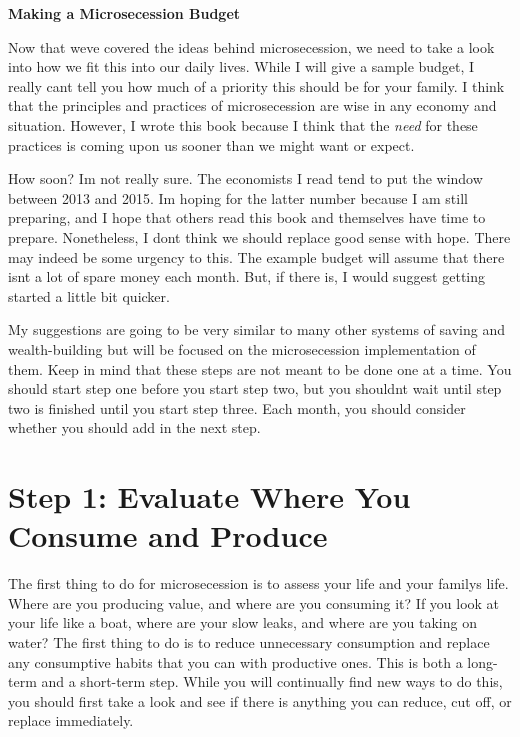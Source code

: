 \documentclass[letterpaper]{article}
\title{}
\begin{document}
\clearpage\setcounter{page}{1}\pagestyle{Standard}
{\centering{}\bfseries\color{black}
Making a Microsecession Budget
\par}

{\color{black}
Now that we{\textquotesingle}ve covered the ideas behind microsecession,
we need to take a look into how we fit this into our daily lives. While
I will give a sample budget, I really can{\textquotesingle}t tell you
how much of a priority this should be for your family. I think that the
principles and practices of microsecession are wise in any economy and
situation. However, I wrote this book because I think that the
\textit{need} for these practices is coming upon us sooner than we
might want or expect.}

{\color{black}
How soon?  I{\textquotesingle}m not really sure. The economists I read
tend to put the window between 2013 and 2015. I{\textquotesingle}m
hoping for the latter number because I am still preparing, and I hope
that others read this book and themselves have time to prepare.
Nonetheless, I don{\textquotesingle}t think we should replace good
sense with hope. There may indeed be some urgency to this. The example
budget will assume that there isn{\textquotesingle}t a lot of spare
money each month. But, if there is, I would suggest getting started a
little bit quicker.}

{\color{black}
My suggestions are going to be very similar to many other systems of
saving and wealth-building but will be focused on the microsecession
implementation of them.
\textcolor[rgb]{0.32941177,0.5529412,0.83137256}{Keep in mind that}
these steps are not meant to be done one at a time. You should start
step one before you start step two, but you shouldn{\textquotesingle}t
wait until step two is finished until you start step three. Each month,
you should consider whether you should add in the next step.}

\section{Step 1: Evaluate Where You Consume and Produce}
{\color{black}
The first thing to do for microsecession is to assess your life and your
family{\textquotesingle}s life. Where are you producing value, and
where are you consuming it?  If you look at your life like a boat,
where are your slow leaks, and where are you taking on water?  The
first thing to do is to reduce unnecessary consumption and replace any
consumptive habits that you can with productive ones. This is both a
long-term and a short-term step. While you will continually find new
ways to do this, you should first take a look and see if there is
anything you can reduce, cut off, or replace immediately.}
\end{document}
